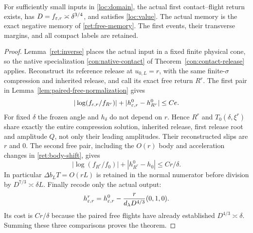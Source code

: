 \begin{theorem}
\label{thm:detuned-value-bridge}
For sufficiently small inputs in \eqref{loc:domain}, the actual first
contact--flight return exists, has $D=f_{\varepsilon,r}\asymp\delta^{3/4}$,
and satisfies \eqref{loc:value}.
The actual memory is the exact negative memory of
\eqref{ret:free-memory}. The first events, their transverse margins,
and all compact labels are retained.
\end{theorem}
\begin{proof}
Lemma~\ref{ret:inverse} places the actual input in a fixed finite
physical cone, so the native specialization
\eqref{con:native-contact} of Theorem~\ref{con:contact-release} applies.
Reconstruct
its reference release at $u_{0,L}=r$, with the same finite-$\sigma$
compression and inherited release, and call its exact free return
$R^r$. The first pair in Lemma~\ref{lem:paired-free-normalization} gives
\[
 |\log(f_{\varepsilon,r}/f_{R^r})|
       +|h_{\varepsilon,r}^{0}-h_{R^r}^{0}|\le Ce.
\]
For fixed $\delta$ the frozen angle and $h_\delta$ do not depend on
$r$. Hence $R^r$ and $T_0(\delta,\xi^r)$ share exactly the entire
compression solution, inherited release, first release root and
amplitude $Q$, not only their leading amplitudes. Their reconstructed
slips are $r$ and $0$. The second free pair, including the $O(r)$ body
and acceleration changes in \eqref{ret:body-shift}, gives
\[
 |\log(f_{R^r}/f_0)|+|h_{R^r}^{0}-h_0|\le Cr/\delta.
\]
In particular $\Delta b_LT=O(rL)$ is retained in the normal numerator
before division by $D^{7/3}\asymp\delta L$.
Finally recode only the actual output:
\begin{equation}
 h_{\varepsilon,r}^r=h_{\varepsilon,r}^0-
               \frac{r}{d_\lambda D^{4/3}}(0,1,0).
 \label{eq:dva-output-recoding}
\end{equation}
Its cost is $Cr/\delta$ because the paired free flights have already
established $D^{4/3}\asymp\delta$. Summing these three comparisons
proves the theorem.
\end{proof}

